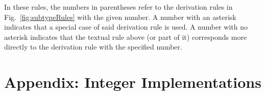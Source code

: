 \documentclass[makeidx]{article}
\begin{document}
{\LMHash{}%
In these rules, the numbers in parentheses refer to the derivation rules in
Fig.~\ref{fig:subtypeRules} with the given number.
A number with an asterisk indicates that
a special case of said derivation rule is used.
A number with no asterisk indicates that the textual rule above
(or part of it) corresponds more directly to
the derivation rule with the specified number.


\section*{Appendix: Integer Implementations}

}
\end{document}
